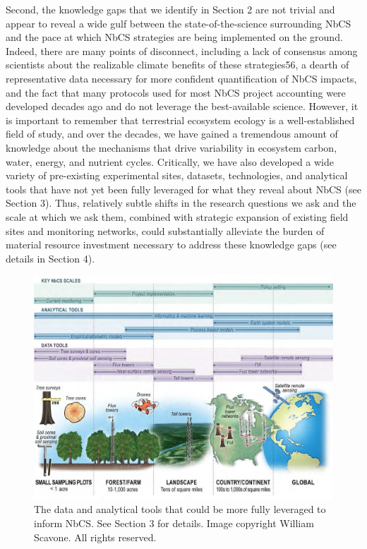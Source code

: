 \documentclass[
  letterpaper,
  DIV=11,
  numbers=noendperiod]{scrreprt}
\begin{document}
Second, the knowledge gaps that we identify in Section 2 are not trivial
and appear to reveal a wide gulf between the state-of-the-science
surrounding NbCS and the pace at which NbCS strategies are being
implemented on the ground. Indeed, there are many points of disconnect,
including a lack of consensus among scientists about the realizable
climate benefits of these strategies56, a dearth of representative data
necessary for more confident quantification of NbCS impacts, and the
fact that many protocols used for most NbCS project accounting were
developed decades ago and do not leverage the best-available science.
However, it is important to remember that terrestrial ecosystem ecology
is a well-established field of study, and over the decades, we have
gained a tremendous amount of knowledge about the mechanisms that drive
variability in ecosystem carbon, water, energy, and nutrient cycles.
Critically, we have also developed a wide variety of pre-existing
experimental sites, datasets, technologies, and analytical tools that
have not yet been fully leveraged for what they reveal about NbCS (see
Section 3). Thus, relatively subtle shifts in the research questions we
ask and the scale at which we ask them, combined with strategic
expansion of existing field sites and monitoring networks, could
substantially alleviate the burden of material resource investment
necessary to address these knowledge gaps (see details in Section 4).

\begin{figure}

{\centering \includegraphics{img/02-nbcs-scales.jpg}

}

\caption{\label{fig-ncbsscales}The data and analytical tools that could
be more fully leveraged to inform NbCS. See Section 3 for details. Image
copyright William Scavone. All rights reserved.}

\end{figure}
\end{document}
